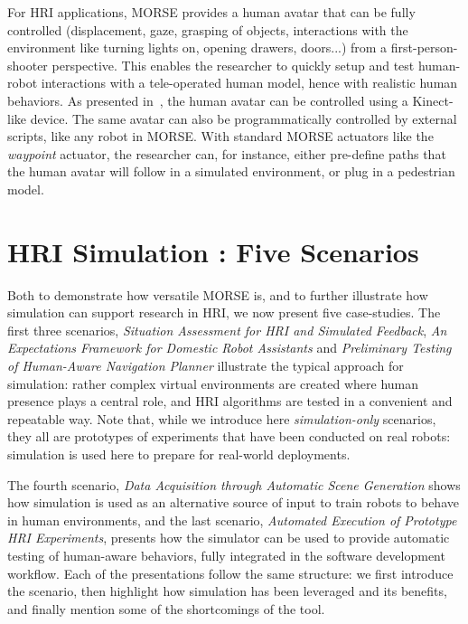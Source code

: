 \documentclass{llncs}
\begin{document}
For HRI applications, MORSE provides a human avatar that can be fully controlled
(displacement, gaze, grasping of objects, interactions with the environment like
turning lights on, opening drawers, doors...) from a first-person-shooter perspective.
This enables the researcher to quickly setup and test human-robot interactions
with a tele-operated human model, hence with realistic human behaviors. As
presented in~\cite{lemaignan2012morse}, the human avatar can be controlled using
a Kinect-like device. The same avatar can also be programmatically controlled
by external scripts, like any robot in MORSE. With standard MORSE actuators like
the \emph{waypoint} actuator, the researcher can, for instance, either pre-define paths
that the human avatar will follow in a simulated environment, or plug in a 
pedestrian model.

\section{HRI Simulation : Five Scenarios}

Both to demonstrate how versatile MORSE is, and to further illustrate 
how simulation can support research in HRI, we now present five case-studies.  
The first three scenarios, \emph{Situation
Assessment for HRI and Simulated Feedback}, \emph{An Expectations Framework for
Domestic Robot Assistants} and \emph{Preliminary Testing of Human-Aware
Navigation Planner} illustrate the typical approach for simulation: rather
complex virtual environments are created where human presence plays a
central role, and HRI algorithms are tested in a convenient and repeatable way.
Note that, while we introduce here \emph{simulation-only} scenarios, they all
are prototypes of experiments that have been conducted on real robots:
simulation is used here to prepare for real-world deployments.

The fourth scenario, \emph{Data Acquisition through Automatic Scene Generation}
shows how simulation is used as an alternative source of input to train robots to
behave in human environments, and the last scenario, \emph{Automated Execution
of Prototype HRI Experiments}, presents how the simulator can be used to provide
automatic testing of human-aware behaviors, fully integrated in the software
development workflow. Each of the presentations follow the same structure: we
first introduce the scenario, then highlight how simulation has been leveraged
and its benefits, and finally mention some of the shortcomings of the tool.
\end{document}
